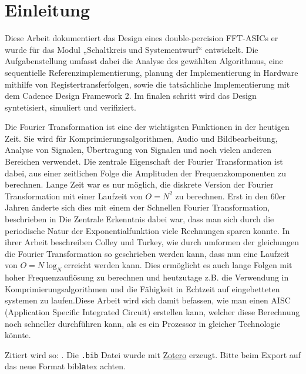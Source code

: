 \documentclass[fontsize=12pt,paper=a4,ngerman]{scrarticle}
\author{Justus Gottfried Hache} %
\begin{document}

\begingroup
\pagestyle{empty}
\null
\newpage
\endgroup

\tableofcontents %
\clearpage

\section{Einleitung}
Diese Arbeit dokumentiert das Design eines double-percision FFT-ASICs er wurde
für das Modul „Schaltkreis und Systementwurf“ entwickelt. Die Aufgabenstellung
umfasst dabei die Analyse des gewählten Algorithmus, eine sequentielle
Referenzimplementierung, planung der Implementierung in Hardware mithilfe von
Registertransferfolgen, sowie die tatsächliche Implementierung mit dem Cadence
Design Framework 2. Im finalen schritt wird das Design syntetisiert, simuliert
und verifiziert.

Die Fourier Transformation ist eine der wichtigsten Funktionen in der heutigen
Zeit. Sie wird für Komprimierungsalgorithmen, Audio und Bildbearbeitung,
Analyse von Signalen, Übertragung von Signalen und noch vielen anderen
Bereichen verwendet. Die zentrale Eigenschaft der Fourier Transformation ist
dabei, aus einer zeitlichen Folge die Amplituden der Frequenzkomponenten zu
berechnen. Lange Zeit war es nur möglich, die diskrete Version der Fourier
Transformation mit einer Laufzeit von $O = N^2$ zu berechnen. Erst in den 60er
Jahren änderte sich dies mit einem der Schnellen Fourier Transformation,
beschrieben in Die Zentrale Erkenntnis dabei war, dass man sich durch die
periodische Natur der Exponentialfunktion viele Rechnungen sparen konnte. In
ihrer Arbeit beschreiben Colley und Turkey, wie durch umformen der gleichungen
die Fourier Transformation so geschrieben werden kann, dass nun eine Laufzeit
von $O=N\log_N$erreicht werden kann. Dies ermöglicht es auch lange Folgen mit
hoher Frequenzauflösung zu berechnen und heutzutage z.B. die Verwendung in
Komprimierungsalgorithmen und die Fähigkeit in Echtzeit auf eingebetteten
systemen zu laufen.Diese Arbeit wird sich damit befassen, wie man einen AISC
(Application Specific Integrated Circuit) erstellen kann, welcher diese
Berechnung noch schneller durchführen kann, als es ein Prozessor in gleicher
Technologie könnte.

Zitiert wird so: \autocite{munafo_escape_2023}. Die \texttt{.bib} Datei wurde
mit \href{https://www.zotero.org/}{Zotero} erzeugt. Bitte beim Export auf das
neue Format bib\textbf{la}tex achten.
\end{document}
